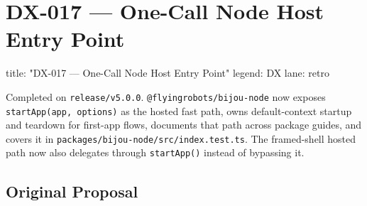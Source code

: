 \chapter{DX-017 --- One-Call Node Host Entry Point}\label{record-326}

\smallskip

\begin{RecordMeta}
title: "DX-017 — One-Call Node Host Entry Point"
legend: DX
lane: retro

\end{RecordMeta}

Completed on \texttt{r\allowbreak{}e\allowbreak{}l\allowbreak{}e\allowbreak{}a\allowbreak{}s\allowbreak{}e\allowbreak{}/\allowbreak{}v\allowbreak{}5\allowbreak{}.\allowbreak{}0\allowbreak{}.\allowbreak{}0}. \texttt{@\allowbreak{}f\allowbreak{}l\allowbreak{}y\allowbreak{}i\allowbreak{}n\allowbreak{}g\allowbreak{}r\allowbreak{}o\allowbreak{}b\allowbreak{}o\allowbreak{}t\allowbreak{}s\allowbreak{}/\allowbreak{}b\allowbreak{}i\allowbreak{}j\allowbreak{}o\allowbreak{}u\allowbreak{}-\allowbreak{}n\allowbreak{}o\allowbreak{}d\allowbreak{}e} now exposes \texttt{s\allowbreak{}t\allowbreak{}a\allowbreak{}r\allowbreak{}t\allowbreak{}A\allowbreak{}p\allowbreak{}p\allowbreak{}(\allowbreak{}a\allowbreak{}p\allowbreak{}p\allowbreak{},\allowbreak{} \allowbreak{}o\allowbreak{}p\allowbreak{}t\allowbreak{}i\allowbreak{}o\allowbreak{}n\allowbreak{}s\allowbreak{})} as the hosted fast path, owns default-context startup and teardown for first-app flows, documents that path across package guides, and covers it in \texttt{p\allowbreak{}a\allowbreak{}c\allowbreak{}k\allowbreak{}a\allowbreak{}g\allowbreak{}e\allowbreak{}s\allowbreak{}/\allowbreak{}b\allowbreak{}i\allowbreak{}j\allowbreak{}o\allowbreak{}u\allowbreak{}-\allowbreak{}n\allowbreak{}o\allowbreak{}d\allowbreak{}e\allowbreak{}/\allowbreak{}s\allowbreak{}r\allowbreak{}c\allowbreak{}/\allowbreak{}i\allowbreak{}n\allowbreak{}d\allowbreak{}e\allowbreak{}x\allowbreak{}.\allowbreak{}t\allowbreak{}e\allowbreak{}s\allowbreak{}t\allowbreak{}.\allowbreak{}t\allowbreak{}s}. The framed-shell hosted path now also delegates through \texttt{s\allowbreak{}t\allowbreak{}a\allowbreak{}r\allowbreak{}t\allowbreak{}A\allowbreak{}p\allowbreak{}p\allowbreak{}(\allowbreak{})} instead of bypassing it.

\section{Original Proposal}\label{record-326-original-proposal}

